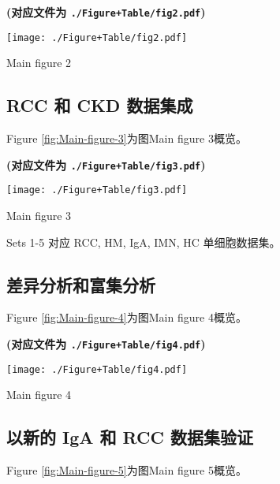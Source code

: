 \documentclass[
]{article}
\begin{document}
\textbf{(对应文件为 \texttt{./Figure+Table/fig2.pdf})}

\def\@captype{figure}
\begin{center}
\texttt{[image: ./Figure+Table/fig2.pdf]}
\caption{Main figure 2}\label{fig:Main-figure-2}
\end{center}

\hypertarget{rcc-ux548c-ckd-ux6570ux636eux96c6ux6210}{%
\subsection{RCC 和 CKD 数据集成}\label{rcc-ux548c-ckd-ux6570ux636eux96c6ux6210}}

Figure \ref{fig:Main-figure-3}为图Main figure 3概览。

\textbf{(对应文件为 \texttt{./Figure+Table/fig3.pdf})}

\def\@captype{figure}
\begin{center}
\texttt{[image: ./Figure+Table/fig3.pdf]}
\caption{Main figure 3}\label{fig:Main-figure-3}
\end{center}

Sets 1-5 对应 RCC, HM, IgA, IMN, HC 单细胞数据集。

\hypertarget{ux5deeux5f02ux5206ux6790ux548cux5bccux96c6ux5206ux6790}{%
\subsection{差异分析和富集分析}\label{ux5deeux5f02ux5206ux6790ux548cux5bccux96c6ux5206ux6790}}

Figure \ref{fig:Main-figure-4}为图Main figure 4概览。

\textbf{(对应文件为 \texttt{./Figure+Table/fig4.pdf})}

\def\@captype{figure}
\begin{center}
\texttt{[image: ./Figure+Table/fig4.pdf]}
\caption{Main figure 4}\label{fig:Main-figure-4}
\end{center}

\hypertarget{ux4ee5ux65b0ux7684-iga-ux548c-rcc-ux6570ux636eux96c6ux9a8cux8bc1}{%
\subsection{以新的 IgA 和 RCC 数据集验证}\label{ux4ee5ux65b0ux7684-iga-ux548c-rcc-ux6570ux636eux96c6ux9a8cux8bc1}}

Figure \ref{fig:Main-figure-5}为图Main figure 5概览。
\end{document}
